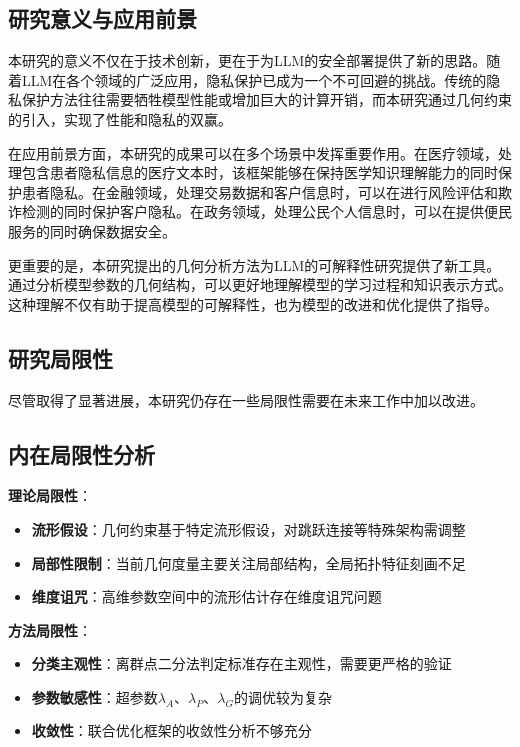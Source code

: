 \subsection{研究意义与应用前景}

本研究的意义不仅在于技术创新，更在于为LLM的安全部署提供了新的思路。随着LLM在各个领域的广泛应用，隐私保护已成为一个不可回避的挑战。传统的隐私保护方法往往需要牺牲模型性能或增加巨大的计算开销，而本研究通过几何约束的引入，实现了性能和隐私的双赢。

在应用前景方面，本研究的成果可以在多个场景中发挥重要作用。在医疗领域，处理包含患者隐私信息的医疗文本时，该框架能够在保持医学知识理解能力的同时保护患者隐私。在金融领域，处理交易数据和客户信息时，可以在进行风险评估和欺诈检测的同时保护客户隐私。在政务领域，处理公民个人信息时，可以在提供便民服务的同时确保数据安全。

更重要的是，本研究提出的几何分析方法为LLM的可解释性研究提供了新工具。通过分析模型参数的几何结构，可以更好地理解模型的学习过程和知识表示方式。这种理解不仅有助于提高模型的可解释性，也为模型的改进和优化提供了指导。

\subsection{研究局限性}

尽管取得了显著进展，本研究仍存在一些局限性需要在未来工作中加以改进。

\subsection{内在局限性分析}

\textbf{理论局限性}：
\begin{itemize}
\item \textbf{流形假设}：几何约束基于特定流形假设，对跳跃连接等特殊架构需调整
\item \textbf{局部性限制}：当前几何度量主要关注局部结构，全局拓扑特征刻画不足
\item \textbf{维度诅咒}：高维参数空间中的流形估计存在维度诅咒问题
\end{itemize}

\textbf{方法局限性}：
\begin{itemize}
\item \textbf{分类主观性}：离群点二分法判定标准存在主观性，需要更严格的验证
\item \textbf{参数敏感性}：超参数$\lambda_A$、$\lambda_P$、$\lambda_G$的调优较为复杂
\item \textbf{收敛性}：联合优化框架的收敛性分析不够充分
\end{itemize}

